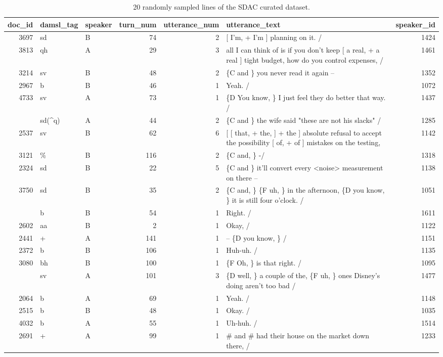 \documentclass[
  letterpaper,
]{scrbook}
\begin{document}
\hypertarget{tbl-td-sdac-preview-curated-dataset}{}
\begin{table}
\caption{\label{tbl-td-sdac-preview-curated-dataset}20 randomly sampled lines of the SDAC curated dataset. }\tabularnewline

\centering
\begin{tabular}{rllrrlr}
\toprule
doc\_id & damsl\_tag & speaker & turn\_num & utterance\_num & utterance\_text & speaker\_id\\
\midrule
3697 & sd & B & 74 & 2 & {}[ I'm, + I'm ] planning on it.  / & 1424\\
3813 & qh & A & 29 & 3 & all I can think of is if you don't keep [ a real, + a real ] tight budget, how do you control expenses,  / & 1461\\
3214 & sv & B & 48 & 2 & \{C and \} you never read it again -- & 1352\\
2967 & b & B & 46 & 1 & Yeah.  / & 1072\\
4733 & sv & A & 73 & 1 & \{D You know, \} I just feel they do better that way. / & 1437\\
\addlinespace
3052 & sd(\textasciicircum{}q) & A & 44 & 2 & \{C and \} the wife said "these are not  his slacks"  / & 1285\\
2537 & sv & B & 62 & 6 & {}[ [ that, +  the, ] +  the ] absolute refusal to accept the possibility [ of, +  of ] mistakes on the testing, & 1142\\
3121 & \% & B & 116 & 2 & \{C and, \} -/ & 1318\\
2324 & sd & B & 22 & 5 & \{C and \} it'll convert every <noise> measurement on there -- & 1138\\
3750 & sd & B & 35 & 2 & \{C and, \} \{F uh, \}  in the afternoon, \{D you know, \} it is still four o'clock.  / & 1051\\
\addlinespace
4723 & b & B & 54 & 1 & Right. / & 1611\\
2602 & aa & B & 2 & 1 & Okay,  / & 1122\\
2441 & + & A & 141 & 1 & -- \{D you know, \}  / & 1151\\
2372 & b & B & 106 & 1 & Huh-uh. / & 1135\\
3080 & bh & B & 100 & 1 & \{F Oh, \} is that right. / & 1095\\
\addlinespace
3777 & sv & A & 101 & 3 & \{D well, \} a couple of the, \{F uh, \} ones Disney's doing aren't too bad  / & 1477\\
2064 & b & A & 69 & 1 & Yeah. / & 1148\\
2515 & b & B & 48 & 1 & Okay. / & 1035\\
4032 & b & A & 55 & 1 & Uh-huh. / & 1514\\
2691 & + & A & 99 & 1 & \# and \# had their house on the market down there,  / & 1233\\
\bottomrule
\end{tabular}
\end{table}
\end{document}
